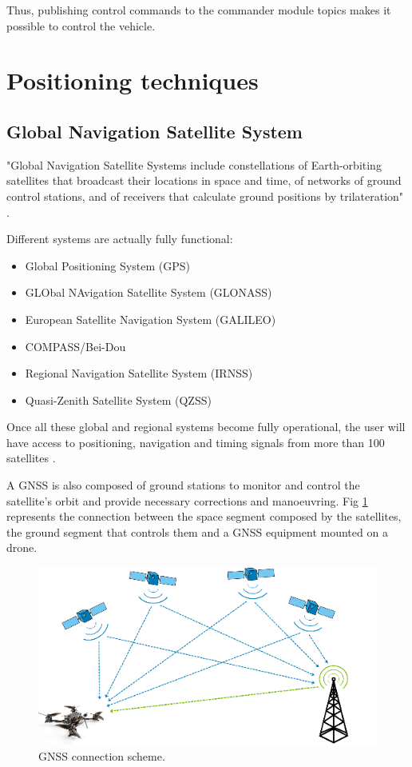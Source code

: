 \documentclass[journal]{IEEEtran}
\begin{document}
Thus, publishing control commands to the commander module topics makes it possible to control the vehicle.

\section{Positioning techniques}
\label{pos_tech}
\subsection{Global Navigation Satellite System}

"Global Navigation Satellite Systems include constellations of Earth-orbiting satellites that broadcast their locations in space and time, of networks of ground control stations, and of receivers that calculate ground positions by trilateration" \cite{gnss}.

Different systems are actually fully functional:

\begin{itemize}
    \item Global Positioning System (GPS)
    \item GLObal NAvigation Satellite System (GLONASS)
    \item European Satellite Navigation System (GALILEO)
    \item COMPASS/Bei-Dou
    \item Regional Navigation Satellite System (IRNSS)
    \item Quasi-Zenith Satellite System (QZSS)
\end{itemize}

Once all these global and regional systems become fully operational, the user will have access to positioning, navigation and timing signals from more than 100 satellites \cite{gnss}.

A GNSS is also composed of ground stations to monitor and control the satellite's orbit and provide necessary corrections and manoeuvring. Fig \ref{gnss_figure} represents the connection between the space segment composed by the satellites, the ground segment that controls them and a GNSS equipment mounted on a drone.

\begin{figure}
    \centering
    \includegraphics[scale=0.33]{Images/gnss.png}
    \caption{GNSS connection scheme.}
    \label{gnss_figure}
\end{figure}
\end{document}

